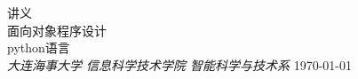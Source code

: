 \begin{titlepage}
  \raggedleft
  {\Large 讲义 \\[1in]}
  {\Huge\scshape 面向对象程序设计 \\ [.2in]}
  {\large python语言 \\}
  \vfill
  {\itshape 大连海事大学 信息科学技术学院 智能科学与技术系}
  {\today}
\end{titlepage}
